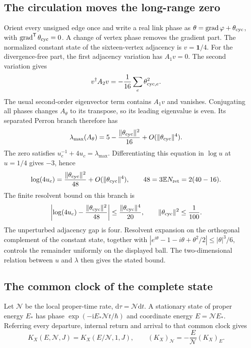 \documentclass[aps,prx,onecolumn,10pt,notitlepage,nofootinbib,longbibliography]{revtex4-2}
\numberwithin{equation}{section}
\numberwithin{table}{section}
\newcommand{\EE}{\mathbb E}
\newcommand{\dd}{\mathrm d}
\newcommand{\ii}{\mathrm i}
\begin{document}
\subsection{The circulation moves the long-range zero}
\label{sec:circulation}
Orient every unsigned edge once and write a real link phase as
$\theta=\operatorname{grad}\varphi+\theta_{\rm cyc}$, with
$\operatorname{grad}^{\mathsf T}\theta_{\rm cyc}=0$. A change of vertex
phase removes the gradient part. The normalized constant state of the
sixteen-vertex adjacency is $v=\mathbf1/4$. For the divergence-free part,
the first adjacency variation has $A_1v=0$. The second variation gives
\begin{equation}
 v^\dagger A_2v=-\frac1{16}\sum_e\theta_{{\rm cyc},e}^2.
 \label{eq:circulationperturbation}
\end{equation}
The usual second-order eigenvector term contains $A_1v$ and vanishes.
Conjugating all phases changes $A_\theta$ to its transpose, so its leading
eigenvalue is even. Its separated Perron branch therefore has
\begin{equation}
 \lambda_{\max}(A_\theta)
 =5-\frac{\|\theta_{\rm cyc}\|^2}{16}+O(\|\theta_{\rm cyc}\|^4).
 \label{eq:circulationperron}
\end{equation}
The zero satisfies $u_c^{-1}+4u_c=\lambda_{\max}$. Differentiating this
equation in $\log u$ at $u=1/4$ gives $-3$, hence
\begin{equation}
 \log(4u_c)=\frac{\|\theta_{\rm cyc}\|^2}{48}
                 +O(\|\theta_{\rm cyc}\|^4),
 \qquad48=3\EE N_{\rm ret}=2(40-16).
 \label{eq:circulation48}
\end{equation}
The finite resolvent bound on this branch is
\begin{equation}
 \left|\log(4u_c)-\frac{\|\theta_{\rm cyc}\|^2}{48}\right|
 \leq\frac{\|\theta_{\rm cyc}\|^4}{20},
 \qquad\|\theta_{\rm cyc}\|^2\leq\frac1{100}.
 \label{eq:circulationbound}
\end{equation}
The unperturbed adjacency gap is four. Resolvent expansion on the
orthogonal complement of the constant state, together with
$|e^{i\theta}-1-i\theta+\theta^2/2|\leq|\theta|^3/6$, controls the
remainder uniformly on the displayed ball. The two-dimensional relation
between $u$ and $\lambda$ then gives the stated bound.

\subsection{The common clock of the complete state}
Let ${\mathcal N}$ be the local proper-time rate, $\dd\tau={\mathcal N}\dd t$. A stationary state of proper energy $E_*$ has phase $\exp(-\ii E_*{\mathcal N}t/\hbar)$ and coordinate energy $E={\mathcal N}E_*$. Referring every departure, internal return and arrival to that common clock gives
\begin{equation}
 K_X(E,{\mathcal N},J)=K_X(E/{\mathcal N},1,J),\qquad
 (K_X)_{\mathcal N}=-\frac E{\mathcal N}(K_X)_E.
 \label{eq:lapse}
\end{equation}
\end{document}
